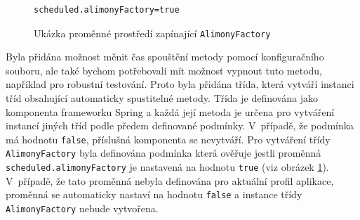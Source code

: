             \begin{figure}
                \begin{verbatim}
scheduled.alimonyFactory=true
                \end{verbatim}
                \caption{Ukázka proměnné prostředí zapínající \texttt{AlimonyFactory}} 
                \label{code:alimony-factory-true}
            \end{figure}
            Byla přidána možnost měnit čas spouštění metody pomocí konfiguračního souboru, ale také bychom potřebovali mít možnost vypnout tuto metodu, například pro robustní testování. Proto byla přidána třída, která vytváří instanci tříd obsahující automaticky spustitelné metody. Třída je definována jako komponenta frameworku Spring a každá její metoda je určena pro vytváření instancí jiných tříd podle předem definované podmínky.
            V~případě, že podmínka má hodnotu \verb|false|, příslušná komponenta se nevytváří.
            Pro vytváření třídy \verb|AlimonyFactory| byla definována podmínka která ověřuje jestli proměnná \verb|scheduled.alimonyFactory| je nastavená na hodnotu \verb|true| (viz obrázek \ref{code:alimony-factory-true}). V~případě, že tato proměnná nebyla definována pro aktuální profil aplikace, proměnná se automaticky nastaví na hodnotu \verb|false| a instance třídy \verb|AlimonyFactory| nebude vytvořena.
        
